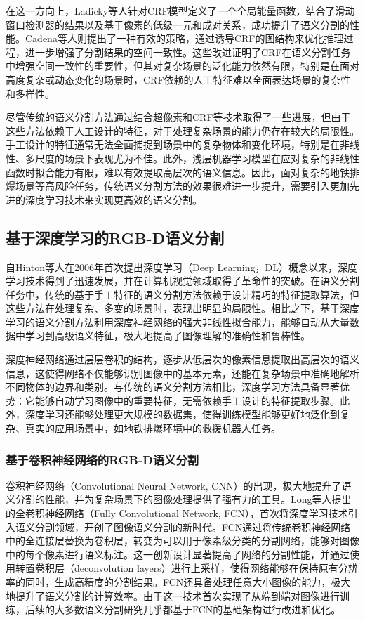 在这一方向上，Ladicky等人\cite{Ladicky10ECCV}针对CRF模型定义了一个全局能量函数，结合了滑动窗口检测器的结果以及基于像素的低级一元和成对关系，成功提升了语义分割的性能。Cadena等人\cite{Cadena14ICRA}则提出了一种有效的策略，通过诱导CRF的图结构来优化推理过程，进一步增强了分割结果的空间一致性。这些改进证明了CRF在语义分割任务中增强空间一致性的重要性，但其对复杂场景的泛化能力依然有限，特别是在面对高度复杂或动态变化的场景时，CRF依赖的人工特征难以全面表达场景的复杂性和多样性。

尽管传统的语义分割方法通过结合超像素和CRF等技术取得了一些进展，但由于这些方法依赖于人工设计的特征，对于处理复杂场景的能力仍存在较大的局限性。手工设计的特征通常无法全面捕捉到场景中的复杂物体和变化环境，特别是在非线性、多尺度的场景下表现尤为不佳。此外，浅层机器学习模型在应对复杂的非线性函数时拟合能力有限，难以有效提取高层次的语义信息。因此，面对复杂的地铁排爆场景等高风险任务，传统语义分割方法的效果很难进一步提升，需要引入更加先进的深度学习技术来实现更高效的语义分割。



\subsection{基于深度学习的RGB-D语义分割}
自Hinton等人\cite{Hinton06Science}在2006年首次提出深度学习（Deep Learning，DL）概念以来，深度学习技术得到了迅速发展，并在计算机视觉领域取得了革命性的突破。在语义分割任务中，传统的基于手工特征的语义分割方法依赖于设计精巧的特征提取算法，但这些方法在处理复杂、多变的场景时，表现出明显的局限性。相比之下，基于深度学习的语义分割方法利用深度神经网络的强大非线性拟合能力，能够自动从大量数据中学习到高级语义特征，极大地提高了图像理解的准确性和鲁棒性。

深度神经网络通过层层卷积的结构，逐步从低层次的像素信息提取出高层次的语义信息，这使得网络不仅能够识别图像中的基本元素，还能在复杂场景中准确地解析不同物体的边界和类别。与传统的语义分割方法相比，深度学习方法具备显著优势：它能够自动学习图像中的重要特征，无需依赖手工设计的特征提取步骤。此外，深度学习还能够处理更大规模的数据集，使得训练模型能够更好地泛化到复杂、真实的应用场景中，如地铁排爆环境中的救援机器人任务。


\subsubsection{基于卷积神经网络的RGB-D语义分割}
卷积神经网络（Convolutional Neural Network, CNN）的出现，极大地提升了语义分割的性能，并为复杂场景下的图像处理提供了强有力的工具。Long等人\cite{Long15CVPR}提出的全卷积神经网络（Fully Convolutional Network, FCN），首次将深度学习技术引入语义分割领域，开创了图像语义分割的新时代。FCN通过将传统卷积神经网络中的全连接层替换为卷积层，转变为可以用于像素级分类的分割网络，能够对图像中的每个像素进行语义标注。这一创新设计显著提高了网络的分割性能，并通过使用转置卷积层（deconvolution layers）进行上采样，使得网络能够在保持原有分辨率的同时，生成高精度的分割结果。FCN还具备处理任意大小图像的能力，极大地提升了语义分割的计算效率。由于这一技术首次实现了从端到端对图像进行训练，后续的大多数语义分割研究几乎都基于FCN的基础架构进行改进和优化。

